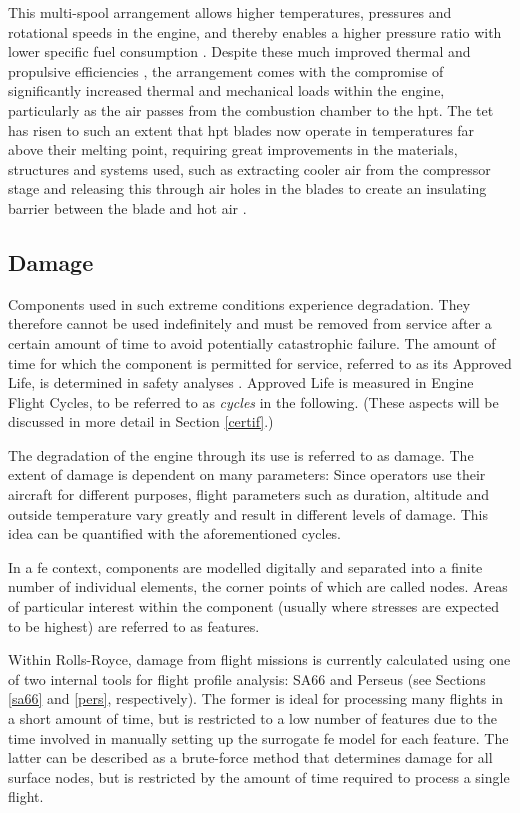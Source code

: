This multi-spool arrangement allows higher temperatures, pressures and rotational speeds in the engine, and thereby enables a higher pressure ratio with lower specific fuel consumption \cite[p. ~20]{rolls-royce_plc_jet_2015}. Despite these much improved thermal and propulsive efficiencies \cite[p. ~225]{rolls-royce_plc_jet_2015}, the arrangement comes with the compromise of significantly increased thermal and mechanical loads within the engine, particularly as the air passes from the combustion chamber to the \ac{hpt}. The \ac{tet} has risen to such an extent that \ac{hpt} blades now operate in temperatures far above their melting point, requiring great improvements in the materials, structures and systems used, such as extracting cooler air from the compressor stage and releasing this through air holes in the blades to create an insulating barrier between the blade and hot air \cite[]{spittle_gas_2003}.

\subsection{Damage}
Components used in such extreme conditions experience degradation. They therefore cannot be used indefinitely and must be removed from service after a certain amount of time to avoid potentially catastrophic failure. The amount of time for which the component is permitted for service, referred to as its Approved Life, is determined in safety analyses \cite[]{easa_certification_2015}. Approved Life is measured in Engine Flight Cycles, to be referred to as \textit{cycles} in the following. (These aspects will be discussed in more detail in Section \ref{certif}.)

The degradation of the engine through its use is referred to as damage. The extent of damage is dependent on many parameters: Since operators use their aircraft for different purposes, flight parameters such as duration, altitude and outside temperature vary greatly and result in different levels of damage. This idea can be quantified with the aforementioned cycles.

In a \ac{fe} context, components are modelled digitally and separated into a finite number of individual elements, the corner points of which are called nodes. Areas of particular interest within the component (usually where stresses are expected to be highest) are referred to as features.

Within Rolls-Royce, damage from flight missions is currently calculated using one of two internal tools for flight profile analysis: SA66 and Perseus (see Sections \ref{sa66} and \ref{pers}, respectively). The former is ideal for processing many flights in a short amount of time, but is restricted to a low number of features due to the time involved in manually setting up the surrogate \ac{fe} model for each feature. The latter can be described as a brute-force method that determines damage for all surface nodes, but is restricted by the amount of time required to process a single flight.


